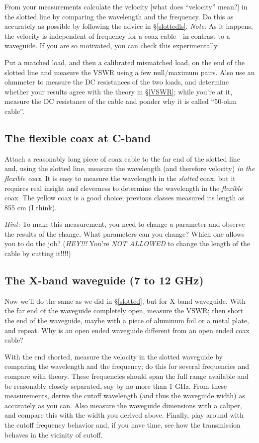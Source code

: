 \documentclass[preprint]{aastex}
\begin{document}
	From your measurements calculate the velocity [what does
``velocity'' mean?] in the slotted line by comparing the wavelength and
the frequency.  Do this as accurately as possible by following the
advice in \S \ref{slottedls}.  {\it Note:} As it happens, the velocity
is independent of frequency for a coax cable---in contrast to a
waveguide.  If you are so motivated, you can check this experimentally. 

	Put a matched load, and then a calibrated mismatched load, on
the end of the slotted line and measure the VSWR using a few
null/maximum pairs.  Also use an ohmmeter to measure the DC resistances
of the two loads, and determine whether your results agree with the
theory in \S \ref{VSWR}; while you're at it, measure the DC resistance
of the cable and ponder why it is called ``50-ohm cable''.

\subsection{The flexible coax at C-band} 

	Attach a reasonably long piece of coax cable to the far end of
the slotted line and, using the slotted line, measure the wavelength
(and therefore velocity) {\it in the flexible coax.} It is easy to
measure the wavelength in the {\it slotted} coax, but it requires real
insight and cleverness to determine the wavelength in the {\it flexible}
coax. The yellow coax is a good choice; previous classes measured its
length as 855 cm (I think).

	{\it Hint:} To make this measurement, you need to change a
parameter and observe the results of the change. What parameters can you
change? Which one allows you to do the job? ({\it HEY!!!} You're {\it
NOT ALLOWED} to change the length of the cable by cutting it!!!!)

\subsection {The X-band waveguide (7 to 12 GHz)} \label{waveguide}

	Now we'll do the same as we did in \S \ref{slotted}, but for
X-band waveguide.  With the far end of the waveguide completely open,
measure the VSWR; then short the end of the waveguide, maybe with a
piece of aluminum foil or a metal plate, and repeat.  Why is an open
ended waveguide different from an open ended coax cable?

	With the end shorted, measure the velocity in the slotted
waveguide by comparing the wavelength and the frequency; do this for
several frequencies and compare with theory.  These frequencies should
span the full range available and be reasonably closely separated, say
by no more than 1 GHz.  From these measurements, derive the cutoff
wavelength (and thus the waveguide width) as accurately as you can. 
Also measure the waveguide dimensions with a caliper, and compare this
with the width you derived above.  Finally, play around with the cutoff
frequency behavior and, if you have time, see how the transmission
behaves in the vicinity of cutoff. 
\end{document}
